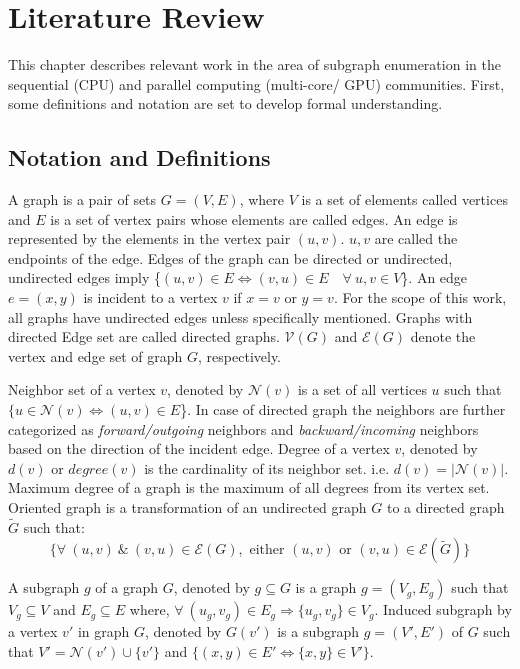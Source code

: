 \chapter{Literature Review}\label{chap:lit}

This chapter describes relevant work in the area of subgraph enumeration in the sequential (CPU) and parallel computing (multi-core/ GPU) communities.
First, some definitions and notation are set to develop formal understanding.

\section{Notation and Definitions}
A graph is a pair of sets $G=(V,E)$, where $V$ is a set of elements called vertices and $E$ is a set of vertex pairs whose elements are called edges.
An edge is represented by the elements in the vertex pair $(u,v)$.
$u, v$ are called the endpoints of the edge.
Edges of the graph can be directed or undirected, undirected edges imply \{$(u,v)\in E \Leftrightarrow (v,u) \in E \quad \forall ~ u, v \in V$\}.
An edge $e = (x,y)$ is incident to a vertex $v$ if $x=v$ or $y=v$.
For the scope of this work, all graphs have undirected edges unless specifically mentioned.
Graphs with directed Edge set are called directed graphs.
$\mathcal{V}(G)$  and $\mathcal{E}(G)$ denote the vertex and edge set of graph $G$, respectively.

Neighbor set of a vertex $v$, denoted by $\mathcal{N}(v)$ is a set of all vertices $u$ such that $\{u \in \mathcal{N}(v) \Leftrightarrow (u,v) \in E$\}.
In case of directed graph the neighbors are further categorized as \textit{forward/outgoing} neighbors and \textit{backward/incoming} neighbors based on the direction of the incident edge.
Degree of a vertex $v$, denoted by $d(v)$ or $degree(v)$ is the cardinality of its neighbor set. i.e. $d(v)=|\mathcal{N}(v)|$.
Maximum degree of a graph is the maximum of all degrees from its vertex set.
Oriented graph is a transformation of an undirected graph $G$ to a directed graph $\tilde{G}$ such that: $$\{\forall~ (u,v) ~\& ~ (v,u) \in \mathcal{E}(G), \text{ either } (u,v) \text{ or } (v,u) \in \mathcal{E}(\tilde{G})\}$$


A subgraph $g$ of a graph $G$, denoted by $g \subseteq G$ is a graph $g=(V_g, E_g)$ such that $V_g \subseteq V$ and $E_g \subseteq E$ where, $\forall~ (u_g, v_g) \in E_g \Rightarrow \{u_g, v_g\} \in V_g$.
Induced subgraph by a vertex $v'$ in graph $G$, denoted by $G(v')$ is a subgraph $g=(V', E')$ of $G$ such that $V'=\mathcal{N}(v')\cup \{v'\}$ and $\{(x,y) \in E'\Leftrightarrow \{x,y\} \in V'\}$.

